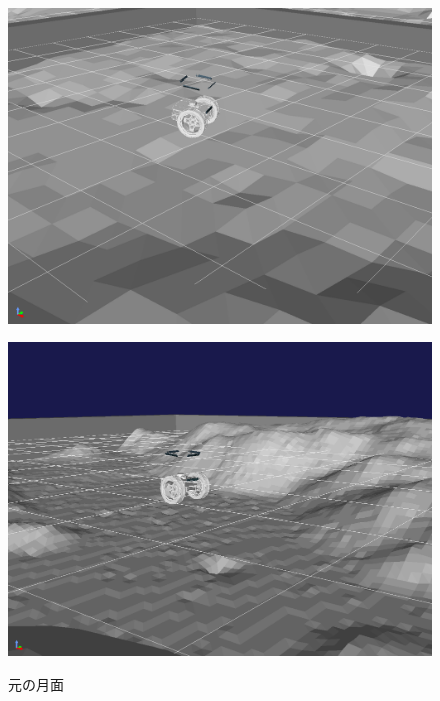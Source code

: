 \documentclass[uplatex,twocolumn, dvipdfmx]{jsarticle}  %
\begin{document}
\begin{figure}[t]
  \centering
  \begin{minipage}[b]{0.47\linewidth}
    \centering
    \includegraphics[keepaspectratio, scale=0.1]{images/origin_moon_field3.png}
    \label{fig:origin_moon_field3}
  \end{minipage}
  \begin{minipage}[b]{0.47\linewidth}
    \centering
    \includegraphics[keepaspectratio, scale=0.096]{images/original_moon_field4.png}
    \label{fig:original_moon_field4}
  \end{minipage}
  \caption{元の月面}
\end{figure}
\end{document}
